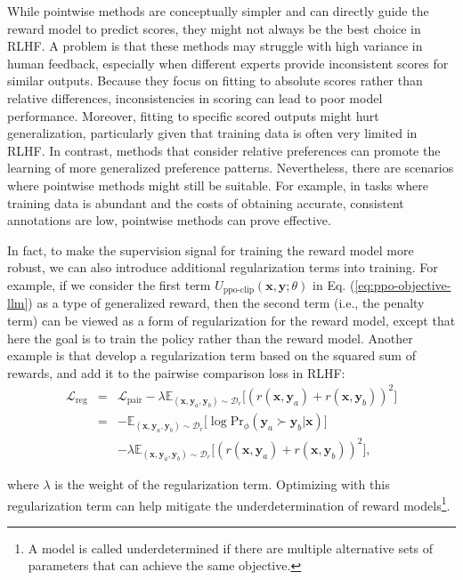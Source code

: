 While pointwise methods are conceptually simpler and can directly guide the reward model to predict scores, they might not always be the best choice in RLHF. A problem is that these methods may struggle with high variance in human feedback, especially when different experts provide inconsistent scores for similar outputs. Because they focus on fitting to absolute scores rather than relative differences, inconsistencies in scoring can lead to poor model performance. Moreover, fitting to specific scored outputs might hurt generalization, particularly given that training data is often very limited in RLHF. In contrast, methods that consider relative preferences can promote the learning of more generalized preference patterns. Nevertheless, there are scenarios where pointwise methods might still be suitable. For example, in tasks where training data is abundant and the costs of obtaining accurate, consistent annotations are low, pointwise methods can prove effective.

In fact, to make the supervision signal for training the reward model more robust, we can also introduce additional regularization terms into training. For example, if we consider the first term $U_{\mathrm{ppo\text{-}clip}}(\mathbf{x},\mathbf{y};\theta)$ in Eq. (\ref{eq:ppo-objective-llm}) as a type of generalized reward, then the second term (i.e., the penalty term) can be viewed as a form of regularization for the reward model, except that here the goal is to train the policy rather than the reward model. Another example is that \citet{eisenstein-etal:2023helping} develop a regularization term based on the squared sum of rewards, and add it to the pairwise comparison loss in RLHF:
\begin{eqnarray}
\mathcal{L}_{\mathrm{reg}} & = & \mathcal{L}_{\mathrm{pair}} -\lambda \mathbb{E}_{(\mathbf{x},\mathbf{y}_a,\mathbf{y}_b) \sim \mathcal{D}_r} \big[ (r(\mathbf{x},\mathbf{y}_a) + r(\mathbf{x},\mathbf{y}_b) )^2 \big] \nonumber \\
& = & -\mathbb{E}_{(\mathbf{x},\mathbf{y}_a,\mathbf{y}_b) \sim \mathcal{D}_r} \big[ \log \mathrm{Pr}_{\phi}(\mathbf{y}_a \succ \mathbf{y}_b | \mathbf{x}) \big] \nonumber \\
&   & -\lambda  \mathbb{E}_{(\mathbf{x},\mathbf{y}_a,\mathbf{y}_b) \sim \mathcal{D}_r} \big[ (r(\mathbf{x},\mathbf{y}_a) + r(\mathbf{x},\mathbf{y}_b) )^2 \big],
\end{eqnarray}

\noindent where $\lambda$ is the weight of the regularization term. Optimizing with this regularization term can help mitigate the underdetermination of reward models\footnote{A model is called underdetermined if there are multiple alternative sets of parameters that can achieve the same objective.}.

